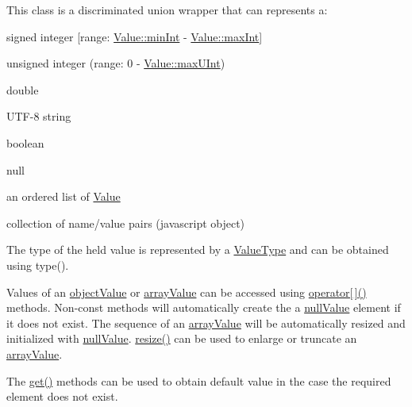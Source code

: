 This class is a discriminated union wrapper that can represents a\+:
\begin{DoxyItemize}
\item signed integer \mbox{[}range\+: \hyperlink{classJson_1_1Value_a7df8a39e2502b8c92a6a41e3d752d2c8}{Value\+::min\+Int} -\/ \hyperlink{classJson_1_1Value_a978c799a8af3114ef7dab6fd0a310a1b}{Value\+::max\+Int}\mbox{]}
\item unsigned integer (range\+: 0 -\/ \hyperlink{classJson_1_1Value_ac79e63ee68d3aa914bfd6988be669b87}{Value\+::max\+U\+Int})
\item double
\item U\+T\+F-\/8 string
\item boolean
\item \textquotesingle{}null\textquotesingle{}
\item an ordered list of \hyperlink{classJson_1_1Value}{Value}
\item collection of name/value pairs (javascript object)
\end{DoxyItemize}

The type of the held value is represented by a \hyperlink{namespaceJson_a7d654b75c16a57007925868e38212b4e}{Value\+Type} and can be obtained using type().

Values of an \hyperlink{namespaceJson_a7d654b75c16a57007925868e38212b4eae8386dcfc36d1ae897745f7b4f77a1f6}{object\+Value} or \hyperlink{namespaceJson_a7d654b75c16a57007925868e38212b4eadc8f264f36b55b063c78126b335415f4}{array\+Value} can be accessed using \hyperlink{classJson_1_1Value_a7d99f5dba388cdaa152ce6ef933d64ef}{operator\mbox{[}$\,$\mbox{]}()} methods. Non-\/const methods will automatically create the a \hyperlink{namespaceJson_a7d654b75c16a57007925868e38212b4ea7d9899633b4409bd3fc107e6737f8391}{null\+Value} element if it does not exist. The sequence of an \hyperlink{namespaceJson_a7d654b75c16a57007925868e38212b4eadc8f264f36b55b063c78126b335415f4}{array\+Value} will be automatically resized and initialized with \hyperlink{namespaceJson_a7d654b75c16a57007925868e38212b4ea7d9899633b4409bd3fc107e6737f8391}{null\+Value}. \hyperlink{classJson_1_1Value_aa284353271ada427dbfa04a42f2be407}{resize()} can be used to enlarge or truncate an \hyperlink{namespaceJson_a7d654b75c16a57007925868e38212b4eadc8f264f36b55b063c78126b335415f4}{array\+Value}.

The \hyperlink{classJson_1_1Value_a28282c9b76fa031eba7a1843c47c16fe}{get()} methods can be used to obtain default value in the case the required element does not exist.

